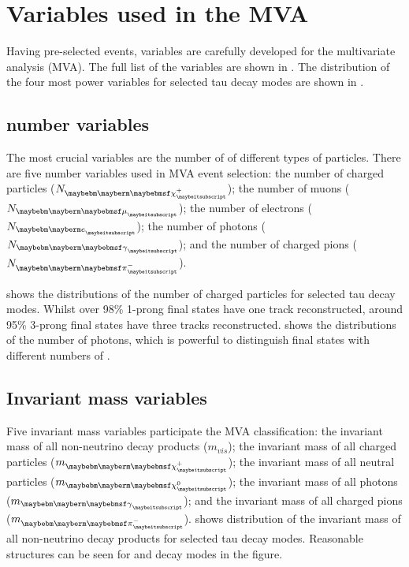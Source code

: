 \section{Variables used in the MVA}
\label{sec:tauVar}


Having pre-selected events,  variables are carefully developed for the multivariate analysis (MVA). The full list of the variables are shown in . The distribution of the four most power variables for selected tau decay modes are shown in .

\subsection{\PFOs number variables}

The most crucial variables are the number of \PFOs of different types of particles. There are five \PFOs number variables used in MVA event selection: the number of charged particles (${N}_{\charge}$); the number of muons (${N}_{\Pmu}$); the number of electrons (${N}_{\Pe}$); the number of photons (${N}_{\Pgg}$); and the number of charged pions (${N}_{\Pgpm}$).

 shows the distributions of the number of charged particles for selected tau decay modes. Whilst over 98\% 1-prong final states have one track reconstructed, around 95\%  3-prong final states have three tracks reconstructed.  shows the distributions of the number of photons, which is powerful to distinguish final states with different numbers of \Ppizero.


\subsection{Invariant mass variables}

Five invariant mass variables participate the MVA classification: the invariant mass of all non-neutrino decay products ($m_{vis}$); the invariant mass of all charged particles ($m_{\charge}$); the invariant mass of all neutral particles ($m_{\neutral}$); the invariant mass of all photons ($m_{\Pgg}$); and the invariant mass of all charged pions ($m_{\Pgpm}$).  shows distribution of the invariant mass of all non-neutrino decay products for selected tau decay modes. Reasonable structures can be seen for \Prho and \Pai decay modes in the figure.

